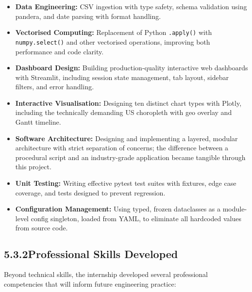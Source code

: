 \documentclass[12pt, a4paper]{report}
\begin{document}
\begin{itemize}[leftmargin=1.5em, itemsep=6pt]
  \item \textbf{Data Engineering:} CSV ingestion with type safety,
    schema validation using pandera, and date parsing with format handling.
  \item \textbf{Vectorised Computing:} Replacement of Python \texttt{.apply()}
    with \texttt{numpy.select()} and other vectorised operations, improving
    both performance and code clarity.
  \item \textbf{Dashboard Design:} Building production-quality interactive
    web dashboards with Streamlit, including session state management,
    tab layout, sidebar filters, and error handling.
  \item \textbf{Interactive Visualisation:} Designing ten distinct chart
    types with Plotly, including the technically demanding US choropleth
    with geo overlay and Gantt timeline.
  \item \textbf{Software Architecture:} Designing and implementing a layered,
    modular architecture with strict separation of concerns; the difference
    between a procedural script and an industry-grade application became
    tangible through this project.
  \item \textbf{Unit Testing:} Writing effective pytest test suites with
    fixtures, edge case coverage, and tests designed to prevent regression.
  \item \textbf{Configuration Management:} Using typed, frozen dataclasses
    as a module-level config singleton, loaded from YAML, to eliminate
    all hardcoded values from source code.
\end{itemize}

\subsection*{5.3.2\quad Professional Skills Developed}

Beyond technical skills, the internship developed several professional
competencies that will inform future engineering practice:
\end{document}
